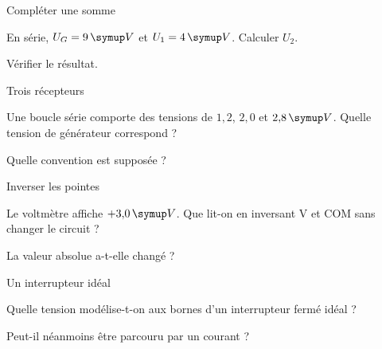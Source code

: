 \par\noindent\begin{minipage}{\linewidth}
\begin{exercice}[2]{Compléter une somme}
\begin{questions}
\item En série, $U_G=9\unite V$ et $U_1=4\unite V$. Calculer $U_2$.
\item Vérifier le résultat.
\end{questions}
\end{exercice}
\end{minipage}
\par\noindent\begin{minipage}{\linewidth}
\begin{exercice}[2]{Trois récepteurs}
\begin{questions}
\item Une boucle série comporte des tensions de $1{,}2$, $2{,}0$ et $2{,}8\unite V$. Quelle tension de générateur correspond ?
\item Quelle convention est supposée ?
\end{questions}
\end{exercice}
\end{minipage}
\par\noindent\begin{minipage}{\linewidth}
\begin{exercice}[2]{Inverser les pointes}
\begin{questions}
\item Le voltmètre affiche $+3{,}0\unite V$. Que lit-on en inversant V et COM sans changer le circuit ?
\item La valeur absolue a-t-elle changé ?
\end{questions}
\end{exercice}
\end{minipage}
\par\noindent\begin{minipage}{\linewidth}
\begin{exercice}[2]{Un interrupteur idéal}
\begin{questions}
\item Quelle tension modélise-t-on aux bornes d’un interrupteur fermé idéal ?
\item Peut-il néanmoins être parcouru par un courant ?
\end{questions}
\end{exercice}
\end{minipage}
